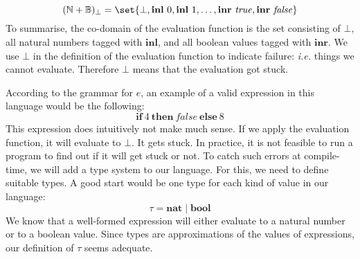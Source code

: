 \documentclass[10pt,a4paper]{exam}
\begin{document}
\begin{questions}
\begin{displaymath}
(\mathbb{N} + \mathbb{B})_{\bot} = \set{\bot, \mathbf{inl}~0,\mathbf{inl}~1, \ldots, \mathbf{inr}~\mathit{true}, \mathbf{inr}~\mathit{false}}
\end{displaymath}
To summarise, the co-domain of the evaluation function is the set consisting of $\bot$, all natural numbers tagged with $\mathbf{inl}$, and all boolean values tagged with $\mathbf{inr}$. We use $\bot$ in the definition of the evaluation function to indicate failure: \emph{i.e.} things we cannot evaluate. Therefore $\bot$ means that the evaluation got stuck.

According to the grammar for $e$, an example of a valid expression in this language would be the following:
\begin{displaymath}
\mathbf{if}~4~\mathbf{then}~\mathit{false}~\mathbf{else}~8
\end{displaymath}
This expression does intuitively not make much sense. If we apply the evaluation function, it will evaluate to $\bot$. It gets stuck. In practice, it is not feasible to run a program to find out if it will get stuck or not. To catch such errors at compile-time, we will add a type system to our language. For this, we need to define suitable types. A good start would be one type for each kind of value in our language: 
\begin{displaymath}
\tau = \mathbf{nat} \mid \mathbf{bool}
\end{displaymath}
We know that a well-formed expression will either evaluate to a natural number or to a boolean value. Since types are approximations of the values of expressions, our definition of $\tau$ seems adequate.





\end{questions}
\end{document}
